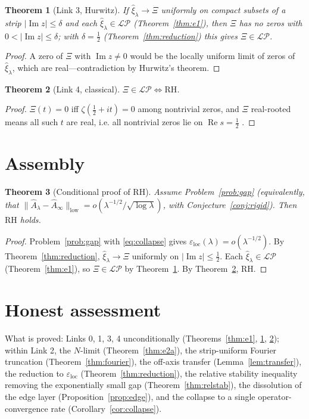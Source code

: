 \documentclass[11pt]{amsart}
\newtheorem{theorem}{Theorem}[section]
\theoremstyle{definition}
\theoremstyle{remark}
\newcommand{\RH}{\mathrm{RH}}
\newcommand{\xih}{\widehat{\xi}}
\newcommand{\Ah}{\widehat{A}}
\newcommand{\LP}{\mathcal{LP}}
\DeclareMathOperator{\Real}{Re}
\DeclareMathOperator{\Imag}{Im}
\begin{document}
\begin{theorem}[Link 3, Hurwitz]\label{thm:e34a}
If $\xih_\lambda\to\Xi$ uniformly on compact subsets of a strip
$|\Imag z|\leq\delta$ and each $\xih_\lambda\in\LP$
(Theorem~\ref{thm:e1}), then $\Xi$ has no zeros with $0<|\Imag z|\leq\delta$;
with $\delta=\tfrac12$ (Theorem~\ref{thm:reduction}) this gives $\Xi\in\LP$.
\end{theorem}
\begin{proof}
A zero of $\Xi$ with $\Imag z\neq0$ would be the locally uniform limit of
zeros of $\xih_\lambda$, which are real---contradiction by Hurwitz's theorem.
\end{proof}

\begin{theorem}[Link 4, classical]\label{thm:e34b}
$\Xi\in\LP\iff\RH$.
\end{theorem}
\begin{proof}
$\Xi(t)=0$ iff $\zeta(\tfrac12+it)=0$ among nontrivial zeros, and $\Xi$
real-rooted means all such $t$ are real, i.e. all nontrivial zeros lie on
$\Real s=\tfrac12$ \cite{deBranges}.
\end{proof}

\section{Assembly}\label{sec:assembly}

\begin{theorem}[Conditional proof of $\RH$]\label{thm:main}
Assume Problem~\ref{prob:gap} (equivalently, that
$\|\Ah_\lambda-\Ah_\infty\|_{\mathrm{low}}=o(\lambda^{-1/2}/\sqrt{\log\lambda})$,
with Conjecture~\ref{conj:rigid}). Then $\RH$ holds.
\end{theorem}
\begin{proof}
Problem~\ref{prob:gap} with \eqref{eq:collapse} gives
$\varepsilon_{\mathrm{loc}}(\lambda)=o(\lambda^{-1/2})$. By
Theorem~\ref{thm:reduction}, $\xih_\lambda\to\Xi$ uniformly on
$|\Imag z|\leq\tfrac12$. Each $\xih_\lambda\in\LP$ (Theorem~\ref{thm:e1}), so
$\Xi\in\LP$ by Theorem~\ref{thm:e34a}. By Theorem~\ref{thm:e34b}, $\RH$.
\end{proof}

\section{Honest assessment}\label{sec:assessment}

What is proved: Links 0, 1, 3, 4 unconditionally
(Theorems~\ref{thm:e1}, \ref{thm:e34a}, \ref{thm:e34b}); within Link 2, the
$N$-limit (Theorem~\ref{thm:e2a}), the strip-uniform Fourier truncation
(Theorem~\ref{thm:fourier}), the off-axis transfer
(Lemma~\ref{lem:transfer}), the reduction to $\varepsilon_{\mathrm{loc}}$
(Theorem~\ref{thm:reduction}), the relative stability inequality removing the
exponentially small gap (Theorem~\ref{thm:relstab}), the dissolution of the
edge layer (Proposition~\ref{prop:edge}), and the collapse to a single
operator-convergence rate (Corollary~\ref{cor:collapse}).
\end{document}
